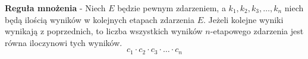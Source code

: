 \documentclass[14pt,a4paper]{extarticle}
\begin{document}
\noindent\textbf{Reguła mnożenia} - Niech $E$ będzie pewnym zdarzeniem,
a $k_{1}, k_{2}, k_{3},\dots, k_{n}$ niech będą ilością wyników w kolejnych etapach zdarzenia $E$.
Jeżeli kolejne wyniki wynikają z poprzednich, to liczba wszystkich wyników $n$-etapowego zdarzenia
jest równa iloczynowi tych wyników.
$$c_{1} \cdot c_{2} \cdot c_{3} \cdot \ldots \cdot c_{n} $$




























\end{document}
